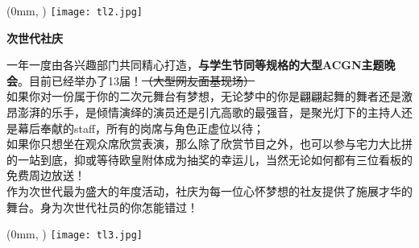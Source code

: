 \begin{textblock*}{\paperwidth}(0mm, \dimexpr\paperheight-78.5mm\relax) %
  \noindent\texttt{[image: tl2.jpg]}
\end{textblock*}
\newpage
\fontsize{26pt}{28pt}\selectfont
\begin{center}
    \textbf{\textcolor{truepurple}{次世代社庆}}\\
\end{center}
\normalsize
\chind 一年一度由各兴趣部门共同精心打造，\textbf{与学生节同等规格的大型ACGN主题晚会}。目前已经举办了13届！\sout{（大型网友面基现场）}\\
\chind 如果你对一份属于你的二次元舞台有梦想，无论梦中的你是翩翩起舞的舞者还是激昂澎湃的乐手，是倾情演绎的演员还是引亢高歌的最强音，是聚光灯下的主持人还是幕后奉献的staff，所有的岗席与角色正虚位以待；\\
\chind 如果你只想坐在观众席欣赏表演，那么除了欣赏节目之外，也可以参与宅力大比拼的一站到底，抑或等待欧皇附体成为抽奖的幸运儿，当然无论如何都有三位看板的免费周边放送！\\
\chind 作为次世代最为盛大的年度活动，社庆为每一位心怀梦想的社友提供了施展才华的舞台。身为次世代社员的你怎能错过！\\
\vspace{1em}
\par
{}
\hfill
\vspace{1em}
\begin{textblock*}{\paperwidth}(0mm, \dimexpr\paperheight-78.5mm\relax) %
  \noindent\texttt{[image: tl3.jpg]}
\end{textblock*}



